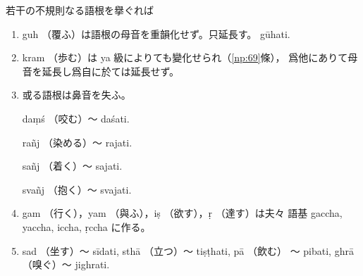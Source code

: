 \numberParagraph
若干の不規則なる語根を擧ぐれば
\begin{enumerate}[label=(\alph*)]
\item guh （覆ふ）は語根の母音を重韻化せず。只延長す。
gūhati.
\item kram （歩む）は ya 級によりても變化せられ（\ref{np:69}條），
爲他にありて母音を延長し爲自に於ては延長せず。
\item 或る語根は鼻音を失ふ。

\indent daṃś （咬む）～ daśati.

\indent rañj （染める）～ rajati.

\indent sañj （着く）～ sajati.

\indent svañj （抱く）～ svajati.
\item gam （行く），yam （與ふ），iṣ （欲す），ṛ （達す）は夫々
語基 gaccha, yaccha, iccha, ṛccha に作る。
\item sad （坐す）～ sīdati, sthā （立つ）～ tiṣṭhati, pā （飲む）
～ pibati, ghrā （嗅ぐ）～ jighrati.
\end{enumerate}


